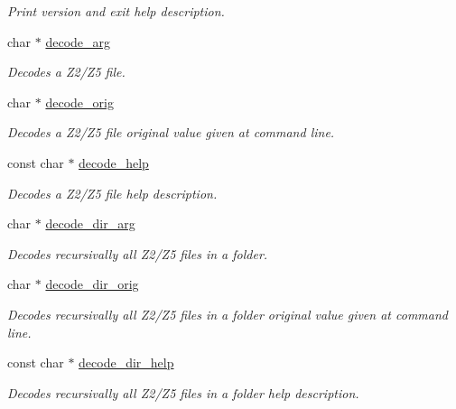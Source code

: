 \begin{DoxyCompactItemize}
\begin{DoxyCompactList}\small\item\em Print version and exit help description. \end{DoxyCompactList}\item 
char $\ast$ \hyperlink{structgengetopt__args__info_a206c402ceafa179717ab062a22d33195}{decode\+\_\+arg}
\begin{DoxyCompactList}\small\item\em Decodes a Z2/\+Z5 file. \end{DoxyCompactList}\item 
char $\ast$ \hyperlink{structgengetopt__args__info_a644ec685e6e8744ec5d1f8ba7599b689}{decode\+\_\+orig}
\begin{DoxyCompactList}\small\item\em Decodes a Z2/\+Z5 file original value given at command line. \end{DoxyCompactList}\item 
const char $\ast$ \hyperlink{structgengetopt__args__info_a39def96c6bc0331ae3da8fdfc598901a}{decode\+\_\+help}
\begin{DoxyCompactList}\small\item\em Decodes a Z2/\+Z5 file help description. \end{DoxyCompactList}\item 
char $\ast$ \hyperlink{structgengetopt__args__info_a60e3abd0a9d89e3d8967900ce8039731}{decode\+\_\+dir\+\_\+arg}
\begin{DoxyCompactList}\small\item\em Decodes recursivally all Z2/\+Z5 files in a folder. \end{DoxyCompactList}\item 
char $\ast$ \hyperlink{structgengetopt__args__info_acca497056dfc93c6d01dead7856a2318}{decode\+\_\+dir\+\_\+orig}
\begin{DoxyCompactList}\small\item\em Decodes recursivally all Z2/\+Z5 files in a folder original value given at command line. \end{DoxyCompactList}\item 
const char $\ast$ \hyperlink{structgengetopt__args__info_a6292363bbfa2c413ad4fbe9938b36ad0}{decode\+\_\+dir\+\_\+help}
\begin{DoxyCompactList}\small\item\em Decodes recursivally all Z2/\+Z5 files in a folder help description. \end{DoxyCompactList}\item 

\end{DoxyCompactItemize}
